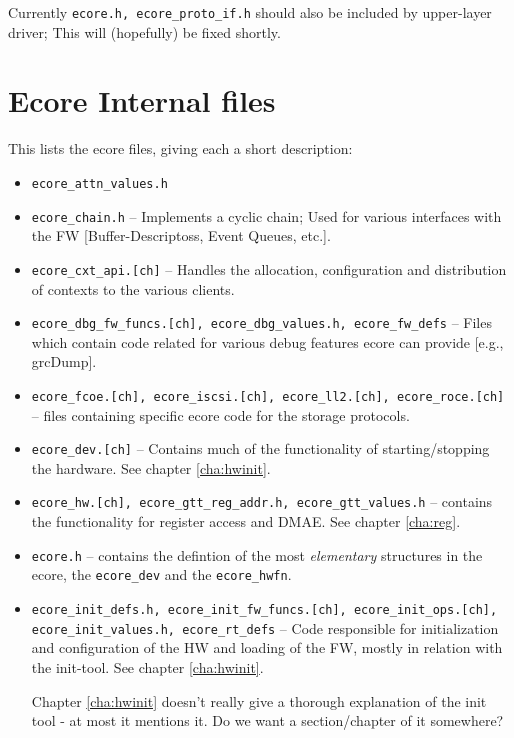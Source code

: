 \documentclass[11pt,fleqn,hidelinks,oneside]{book} %
\newenvironment{warning}
	{\par\begin{mdframed}[style=MyMdStyle] \begin{Warning}}
	{\end{Warning}\end{mdframed}\vspace{5pt}\par}
\newenvironment{REMINDER}
	{\par\begin{mdframed}[style=MyMdStyle,outerlinecolor=blue,%
  						  linecolor=blue, outerlinewidth=2pt]%
		\begin{reminder}}
  {\end{reminder}\end{mdframed}\par}
\begin{document}
\begin{warning}
Currently \texttt{ecore.h, ecore\_proto\_if.h} should also be included by upper-layer driver; This will (hopefully) be fixed shortly.
\end{warning}


\section{Ecore Internal files}
This lists the ecore files, giving each a short description:

\begin{itemize}
	\item \texttt{ecore\_attn\_values.h}
	
	\item \texttt{ecore\_chain.h} -- Implements a cyclic chain; Used for various interfaces with the FW [Buffer-Descriptoss, Event Queues, etc.].
	
	\item \texttt{ecore\_cxt\_api.[ch]} -- Handles the allocation, configuration and distribution of contexts to the various clients. 
	
	\item \texttt{ecore\_dbg\_fw\_funcs.[ch], ecore\_dbg\_values.h, ecore\_fw\_defs} -- Files which contain code related for various debug features ecore can provide [e.g., grcDump].
	
	\item \texttt{ecore\_fcoe.[ch], ecore\_iscsi.[ch], ecore\_ll2.[ch], ecore\_roce.[ch]} -- files containing specific ecore code for the storage protocols.
	
	\item \texttt{ecore\_dev.[ch]} -- Contains much of the functionality of starting/stopping the hardware. See chapter \ref{cha:hwinit}.
	
	\item \texttt{ecore\_hw.[ch], ecore\_gtt\_reg\_addr.h, ecore\_gtt\_values.h} -- contains the functionality for register access and DMAE. See chapter \ref{cha:reg}.
	
	\item \texttt{ecore.h} -- contains the defintion of the most \textit{elementary} structures in the ecore, the \texttt{ecore\_dev} and the \texttt{ecore\_hwfn}.
	
	\item \texttt{ecore\_init\_defs.h, ecore\_init\_fw\_funcs.[ch], ecore\_init\_ops.[ch], \\ ecore\_init\_values.h, ecore\_rt\_defs} -- Code responsible for initialization and configuration of the HW and loading of the FW, mostly in relation with the init-tool. See chapter \ref{cha:hwinit}.
	\begin{REMINDER}
			Chapter \ref{cha:hwinit} doesn't really give a thorough explanation of the init tool - at most it mentions it. Do we want a section/chapter of it somewhere?
	\end{REMINDER}
	

\end{itemize}
\end{document}
